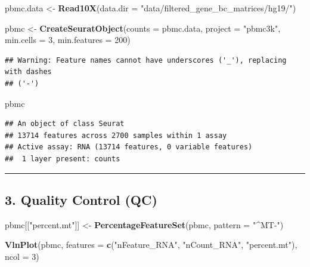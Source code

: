 \documentclass[
]{article}
\newenvironment{Shaded}{\begin{snugshade}}{\end{snugshade}}
\newcommand{\AttributeTok}[1]{\textcolor[rgb]{0.13,0.29,0.53}{#1}}
\newcommand{\DecValTok}[1]{\textcolor[rgb]{0.00,0.00,0.81}{#1}}
\newcommand{\FunctionTok}[1]{\textcolor[rgb]{0.13,0.29,0.53}{\textbf{#1}}}
\newcommand{\NormalTok}[1]{#1}
\newcommand{\OtherTok}[1]{\textcolor[rgb]{0.56,0.35,0.01}{#1}}
\newcommand{\StringTok}[1]{\textcolor[rgb]{0.31,0.60,0.02}{#1}}
\begin{document}
\begin{Shaded}
\begin{Highlighting}[]
\NormalTok{pbmc.data }\OtherTok{\textless{}{-}} \FunctionTok{Read10X}\NormalTok{(}\AttributeTok{data.dir =} \StringTok{"data/filtered\_gene\_bc\_matrices/hg19/"}\NormalTok{)}

\NormalTok{pbmc }\OtherTok{\textless{}{-}} \FunctionTok{CreateSeuratObject}\NormalTok{(}\AttributeTok{counts =}\NormalTok{ pbmc.data,}
                           \AttributeTok{project =} \StringTok{"pbmc3k"}\NormalTok{,}
                           \AttributeTok{min.cells =} \DecValTok{3}\NormalTok{,}
                           \AttributeTok{min.features =} \DecValTok{200}\NormalTok{)}
\end{Highlighting}
\end{Shaded}

\begin{verbatim}
## Warning: Feature names cannot have underscores ('_'), replacing with dashes
## ('-')
\end{verbatim}

\begin{Shaded}
\begin{Highlighting}[]
\NormalTok{pbmc}
\end{Highlighting}
\end{Shaded}

\begin{verbatim}
## An object of class Seurat 
## 13714 features across 2700 samples within 1 assay 
## Active assay: RNA (13714 features, 0 variable features)
##  1 layer present: counts
\end{verbatim}

\begin{center}\rule{0.5\linewidth}{0.5pt}\end{center}

\subsection{3. Quality Control (QC)}\label{quality-control-qc}

\begin{Shaded}
\begin{Highlighting}[]
\NormalTok{pbmc[[}\StringTok{"percent.mt"}\NormalTok{]] }\OtherTok{\textless{}{-}} \FunctionTok{PercentageFeatureSet}\NormalTok{(pbmc, }\AttributeTok{pattern =} \StringTok{"\^{}MT{-}"}\NormalTok{)}

\FunctionTok{VlnPlot}\NormalTok{(pbmc, }\AttributeTok{features =} \FunctionTok{c}\NormalTok{(}\StringTok{"nFeature\_RNA"}\NormalTok{, }\StringTok{"nCount\_RNA"}\NormalTok{, }\StringTok{"percent.mt"}\NormalTok{), }\AttributeTok{ncol =} \DecValTok{3}\NormalTok{)}
\end{Highlighting}
\end{Shaded}
\end{document}
